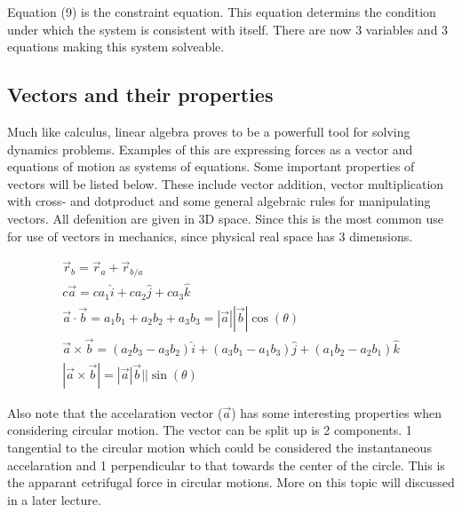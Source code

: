 \documentclass[11pt, a4paper]{article}
\begin{document}
Equation (9) is the constraint equation. This equation determins the condition under which
the system is consistent with itself. There are now 3 variables and 3 equations making this system solveable.

\subsection{Vectors and their properties}
Much like calculus, linear algebra proves to be a powerfull tool for solving dynamics problems.
Examples of this are expressing forces as a vector and equations of motion as systems of equations.
Some important properties of vectors will be listed below. These include vector addition, vector multiplication 
with cross- and dotproduct and some general algebraic rules for manipulating vectors. All defenition are given in 3D space.
Since this is the most common use for use of vectors in mechanics, since physical real space has 3 dimensions.

\setcounter{equation}{0}
\begin{gather}
    \vec{r}_b = \vec{r}_a + \vec{r}_{b/a} \\
    c \vec{a} = ca_1\hat{i} + ca_2\hat{j} + ca_3\hat{k}\\
    \vec{a} \cdot \vec{b} = a_1 b_1 + a_2 b_2 + a_3 b_3 = |\vec{a}||\vec{b}|\cos(\theta)\\
    \vec{a} \times \vec{b} = (a_2 b_3 - a_3b_2)\hat{i} + (a_3 b_1 - a_1 b_3)\hat{j} + (a_1 b_2 - a_2 b_1)\hat{k}\\
    |\vec{a} \times \vec{b}| = |\vec{a}|\vec{b}||\sin(\theta)
\end{gather}

Also note that the accelaration vector ($\vec{a}$) has some interesting properties when considering
circular motion. The vector can be split up is 2 components. 1 tangential to the circular motion
which could be considered the instantaneous accelaration and 1 perpendicular to that towards the center
of the circle. This is the apparant cetrifugal force in circular motions. More on this topic will 
discussed in a later lecture.
\newpage
\end{document}
